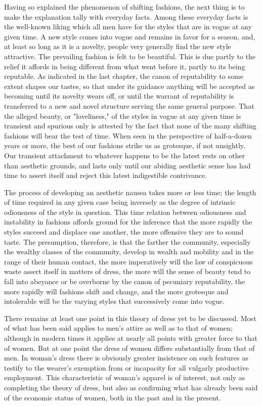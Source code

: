 \documentclass[12pt]{report}
\begin{document}
Having so explained the phenomenon of shifting fashions, the next
thing is to make the explanation tally with everyday facts. Among these
everyday facts is the well-known liking which all men have for the
styles that are in vogue at any given time. A new style comes into vogue
and remains in favor for a season, and, at least so long as it is
a novelty, people very generally find the new style attractive. The
prevailing fashion is felt to be beautiful. This is due partly to the
relief it affords in being different from what went before it, partly
to its being reputable. As indicated in the last chapter, the canon
of reputability to some extent shapes our tastes, so that under its
guidance anything will be accepted as becoming until its novelty wears
off, or until the warrant of reputability is transferred to a new and
novel structure serving the same general purpose. That the alleged
beauty, or "loveliness," of the styles in vogue at any given time is
transient and spurious only is attested by the fact that none of the
many shifting fashions will bear the test of time. When seen in the
perspective of half-a-dozen years or more, the best of our fashions
strike us as grotesque, if not unsightly. Our transient attachment to
whatever happens to be the latest rests on other than aesthetic grounds,
and lasts only until our abiding aesthetic sense has had time to assert
itself and reject this latest indigestible contrivance.

The process of developing an aesthetic nausea takes more or less time;
the length of time required in any given case being inversely as the
degree of intrinsic odiousness of the style in question. This time
relation between odiousness and instability in fashions affords ground
for the inference that the more rapidly the styles succeed and
displace one another, the more offensive they are to sound taste. The
presumption, therefore, is that the farther the community, especially
the wealthy classes of the community, develop in wealth and mobility and
in the range of their human contact, the more imperatively will the law
of conspicuous waste assert itself in matters of dress, the more will
the sense of beauty tend to fall into abeyance or be overborne by the
canon of pecuniary reputability, the more rapidly will fashions shift
and change, and the more grotesque and intolerable will be the varying
styles that successively come into vogue.

There remains at least one point in this theory of dress yet to be
discussed. Most of what has been said applies to men's attire as well
as to that of women; although in modern times it applies at nearly all
points with greater force to that of women. But at one point the dress
of women differs substantially from that of men. In woman's dress there
is obviously greater insistence on such features as testify to the
wearer's exemption from or incapacity for all vulgarly productive
employment. This characteristic of woman's apparel is of interest, not
only as completing the theory of dress, but also as confirming what has
already been said of the economic status of women, both in the past and
in the present.
\end{document}
